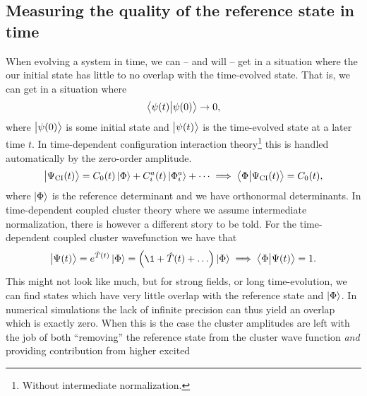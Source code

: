         \subsection{Measuring the quality of the reference state in time}
            When evolving a system in time, we can -- and will -- get in a
            situation where the our initial state has little to no overlap with
            the time-evolved state.
            That is, we can get in a situation where
            \begin{align}
                \braket{\psi(t)}{\psi(0)} \to 0,
            \end{align}
            where $\ket{\psi(0)}$ is some initial state and $\ket{\psi(t)}$ is
            the time-evolved state at a later time $t$.
            In time-dependent configuration interaction theory\footnote{
                Without intermediate normalization.
            } this is handled automatically by the
            zero-order amplitude.
            \begin{gather}
                \ket{\Psi_{\text{CI}}(t)} = C_0(t)\ket{\Phi} + C^{a}_{i}(t)\ket{\Phi^{a}_{i}} + \dots
                \implies \braket{\Phi}{\Psi_{\text{CI}}(t)} = C_0(t),
            \end{gather}
            where $\ket{\Phi}$ is the reference determinant and we have
            orthonormal determinants.
            In time-dependent coupled cluster theory where we assume
            intermediate normalization, there is however a different story to be
            told.
            For the time-dependent coupled cluster wavefunction we have that
            \begin{gather}
                \ket{\Psi(t)} = e^{\clust(t)}\ketslat
                = \para{
                    \1
                    + \clust(t)
                    + \dots
                }\ketslat
                \implies
                \braket{\slat}{\Psi(t)} = 1.
            \end{gather}
            This might not look like much, but for strong fields, or long
            time-evolution, we can find states which have very little overlap
            with the reference state and $\ket{\Phi}$.
            In numerical simulations the lack of infinite precision can thus
            yield an overlap which is exactly zero.
            When this is the case the cluster amplitudes are left with the job
            of both ``removing'' the reference state from the cluster wave
            function \emph{and} providing contribution from higher excited
